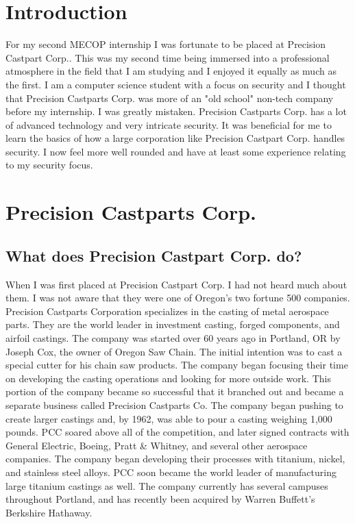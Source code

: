 \documentclass[letterpaper,10pt,notitlepage,fleqn]{article}
\begin{document}
\tableofcontents
\newpage

\section{Introduction}
\indent For my second MECOP internship I was fortunate to be placed at Precision Castpart Corp.. This 
was my second time being immersed into a professional atmosphere in the field that 
I am studying and I enjoyed it equally as much as the first. I am a computer science student with a focus 
on security and I thought that Precision Castparts Corp. was more of an "old school" 
non-tech company before my internship. I was greatly mistaken. Precision Castparts Corp. has a lot of advanced 
technology and very intricate security. It was 
beneficial for me to learn the basics of how a large corporation like Precision Castpart Corp. 
handles security. I now feel more well rounded and have at least some experience relating to
my security focus.

\section{Precision Castparts Corp.}

\subsection{What does Precision Castpart Corp. do?}
\indent When I was first placed at Precision Castpart Corp. I had not heard much about them. I 
was not aware that they were one of Oregon's two fortune 500 companies.
Precision Castparts Corporation specializes in the casting of metal aerospace parts. 
They are the world leader in investment casting, forged components, and airfoil castings. 
The company was started over 60 years ago in Portland, OR by Joseph Cox, the owner of 
Oregon Saw Chain. The initial intention was to cast a special cutter for his chain saw 
products. The company began focusing their time on developing the casting operations 
and looking for more outside work. This portion of the company became so successful that 
it branched out and became a separate business called Precision Castparts Co. The company 
began pushing to create larger castings and, by 1962, was able to pour a casting weighing 
1,000 pounds. PCC soared above all of the competition, and later signed contracts with 
General Electric, Boeing, Pratt \& Whitney, and several other aerospace companies. The company 
began developing their processes with titanium, nickel, and stainless steel alloys. PCC soon
became the world leader of manufacturing large titanium castings as well. The company currently 
has several campuses throughout Portland, and has recently been acquired by Warren 
Buffett's Berkshire Hathaway.
\end{document}
